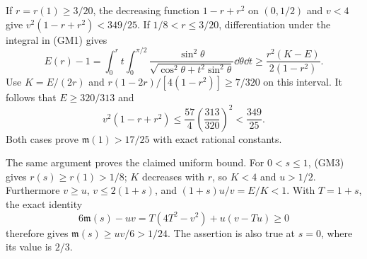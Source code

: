 \documentclass[11pt]{article}
\begin{document}
If $r=r(1)\ge3/20$, the decreasing function $1-r+r^2$ on $(0,1/2)$
and $v<4$ give $v^2(1-r+r^2)<349/25$.
If $1/8<r\le3/20$, differentiation under the integral in (GM1) gives
\begin{equation}\tag{GM19}
 E(r)-1=\int_0^r t\int_0^{\pi/2}
 \frac{\sin^2\theta}{\sqrt{\cos^2\theta+t^2\sin^2\theta}}
 \dd\theta\dd t
 \ge\frac{r^2(K-E)}{2(1-r^2)}.
\end{equation}
Use $K=E/(2r)$ and
$r(1-2r)/[4(1-r^2)]\ge7/320$ on this interval.
It follows that $E\ge320/313$ and
\[
 v^2(1-r+r^2)\le\frac{57}{4}\left(\frac{313}{320}\right)^2
 <\frac{349}{25}.
\]
Both cases prove $\mathfrak m(1)>17/25$ with exact rational constants.

The same argument proves the claimed uniform bound. For $0<s\le1$,
(GM3) gives $r(s)\ge r(1)>1/8$; $K$ decreases with $r$, so $K<4$
and $u>1/2$. Furthermore $v\ge u$, $v\le2(1+s)$, and
$(1+s)u/v=E/K<1$. With $T=1+s$, the exact identity
\begin{equation}\tag{GM20}
 6\mathfrak m(s)-uv=T(4T^2-v^2)+u(v-Tu)\ge0
\end{equation}
therefore gives $\mathfrak m(s)\ge uv/6>1/24$. The assertion is also
true at $s=0$, where its value is $2/3$.
\end{document}
